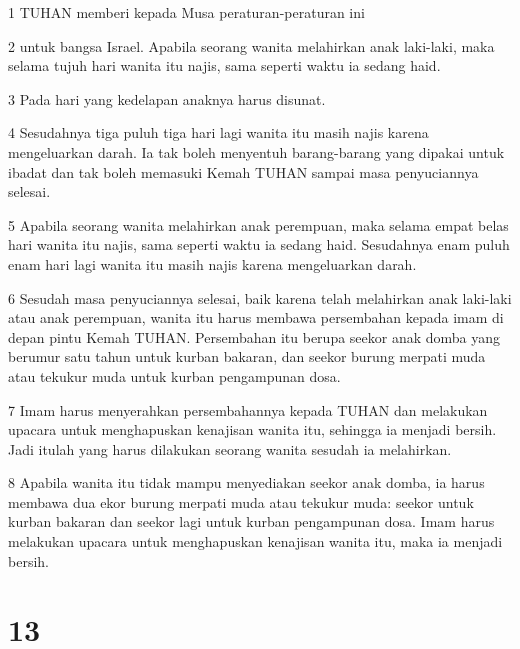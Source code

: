 \par 1 TUHAN memberi kepada Musa peraturan-peraturan ini
\par 2 untuk bangsa Israel. Apabila seorang wanita melahirkan anak laki-laki, maka selama tujuh hari wanita itu najis, sama seperti waktu ia sedang haid.
\par 3 Pada hari yang kedelapan anaknya harus disunat.
\par 4 Sesudahnya tiga puluh tiga hari lagi wanita itu masih najis karena mengeluarkan darah. Ia tak boleh menyentuh barang-barang yang dipakai untuk ibadat dan tak boleh memasuki Kemah TUHAN sampai masa penyuciannya selesai.
\par 5 Apabila seorang wanita melahirkan anak perempuan, maka selama empat belas hari wanita itu najis, sama seperti waktu ia sedang haid. Sesudahnya enam puluh enam hari lagi wanita itu masih najis karena mengeluarkan darah.
\par 6 Sesudah masa penyuciannya selesai, baik karena telah melahirkan anak laki-laki atau anak perempuan, wanita itu harus membawa persembahan kepada imam di depan pintu Kemah TUHAN. Persembahan itu berupa seekor anak domba yang berumur satu tahun untuk kurban bakaran, dan seekor burung merpati muda atau tekukur muda untuk kurban pengampunan dosa.
\par 7 Imam harus menyerahkan persembahannya kepada TUHAN dan melakukan upacara untuk menghapuskan kenajisan wanita itu, sehingga ia menjadi bersih. Jadi itulah yang harus dilakukan seorang wanita sesudah ia melahirkan.
\par 8 Apabila wanita itu tidak mampu menyediakan seekor anak domba, ia harus membawa dua ekor burung merpati muda atau tekukur muda: seekor untuk kurban bakaran dan seekor lagi untuk kurban pengampunan dosa. Imam harus melakukan upacara untuk menghapuskan kenajisan wanita itu, maka ia menjadi bersih.

\chapter{13}

